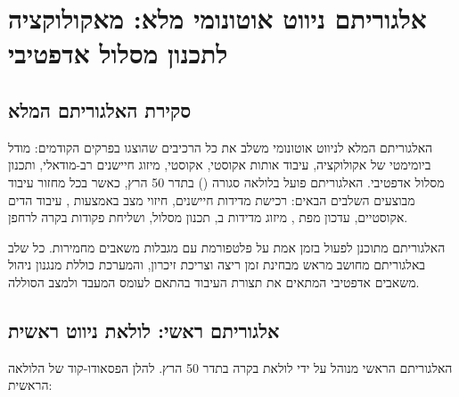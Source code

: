 

\section{אלגוריתם ניווט אוטונומי מלא: מאקולוקציה לתכנון מסלול אדפטיבי}
\label{sec:ch06_algorithm}

\subsection{סקירת האלגוריתם המלא}
\label{sec:ch06_overview}

האלגוריתם המלא לניווט אוטונומי משלב את כל הרכיבים שהוצגו בפרקים הקודמים: מודל ביומימטי של אקולוקציה, עיבוד אותות אקוסטי,  אקוסטי, מיזוג חיישנים רב-מודאלי, ותכנון מסלול אדפטיבי. האלגוריתם פועל בלולאה סגורה () בתדר 50 הרץ, כאשר בכל מחזור עיבוד מבוצעים השלבים הבאים: רכישת מדידות חיישנים, חיזוי מצב באמצעות , עיבוד הדים אקוסטיים, עדכון מפת , מיזוג מדידות ב, תכנון מסלול, ושליחת פקודות בקרה לרחפן. \cite{Thrun2005ProbRobotics} \cite{CrewAIDocs}

האלגוריתם מתוכנן לפעול בזמן אמת על פלטפורמת  עם מגבלות משאבים מחמירות. כל שלב באלגוריתם מחושב מראש מבחינת זמן ריצה וצריכת זיכרון, והמערכת כוללת מנגנון ניהול משאבים אדפטיבי המתאים את תצורת העיבוד בהתאם לעומס המעבד ולמצב הסוללה. \cite{CrewAIDocs}

\subsection{אלגוריתם ראשי: לולאת ניווט ראשית}
\label{sec:ch06_main_loop}

האלגוריתם הראשי מנוהל על ידי לולאת בקרה בתדר 50 הרץ. להלן הפסאודו-קוד של הלולאה הראשית:

